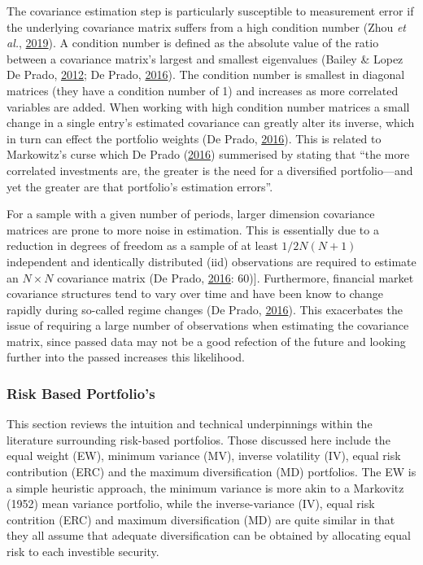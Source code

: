\documentclass[11pt,preprint, authoryear]{elsarticle}
\numberwithin{equation}{section}
\numberwithin{figure}{section}
\numberwithin{table}{section}
\begin{document}
The covariance estimation step is particularly susceptible to
measurement error if the underlying covariance matrix suffers from a
high condition number (Zhou \emph{et al.},
\protect\hyperlink{ref-zhou2019}{2019}). A condition number is defined
as the absolute value of the ratio between a covariance matrix's largest
and smallest eigenvalues (Bailey \& Lopez De Prado,
\protect\hyperlink{ref-lopez2012}{2012}; De Prado,
\protect\hyperlink{ref-lopez}{2016}). The condition number is smallest
in diagonal matrices (they have a condition number of 1) and increases
as more correlated variables are added. When working with high condition
number matrices a small change in a single entry's estimated covariance
can greatly alter its inverse, which in turn can effect the portfolio
weights (De Prado, \protect\hyperlink{ref-lopez}{2016}). This is related
to Markowitz's curse which De Prado
(\protect\hyperlink{ref-lopez}{2016}) summerised by stating that ``the
more correlated investments are, the greater is the need for a
diversified portfolio---and yet the greater are that portfolio's
estimation errors''.

For a sample with a given number of periods, larger dimension covariance
matrices are prone to more noise in estimation. This is essentially due
to a reduction in degrees of freedom as a sample of at least
\(1/2N(N+1)\) independent and identically distributed (iid) observations
are required to estimate an \(N\times N\) covariance matrix (De Prado,
\protect\hyperlink{ref-lopez}{2016}: 60){]}. Furthermore, financial
market covariance structures tend to vary over time and have been know
to change rapidly during so-called regime changes (De Prado,
\protect\hyperlink{ref-lopez}{2016}). This exacerbates the issue of
requiring a large number of observations when estimating the covariance
matrix, since passed data may not be a good refection of the future and
looking further into the passed increases this likelihood.

\hypertarget{risk-based-portfolios}{%
\subsubsection{Risk Based Portfolio's}\label{risk-based-portfolios}}

This section reviews the intuition and technical underpinnings within
the literature surrounding risk-based portfolios. Those discussed here
include the equal weight (EW), minimum variance (MV), inverse volatility
(IV), equal risk contribution (ERC) and the maximum diversification (MD)
portfolios. The EW is a simple heuristic approach, the minimum variance
is more akin to a Markovitz (1952) mean variance portfolio, while the
inverse-variance (IV), equal risk contrition (ERC) and maximum
diversification (MD) are quite similar in that they all assume that
adequate diversification can be obtained by allocating equal risk to
each investible security.
\end{document}
